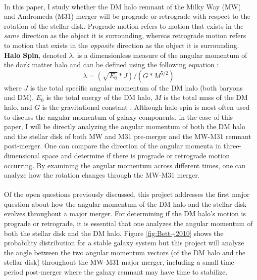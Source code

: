 \documentclass[fleqn,usenatbib]{mnras}
\begin{document}
\paragraph{} In this paper, I study whether the DM halo remnant of the Milky Way (MW) and Andromeda (M31) merger will be prograde or retrograde with respect to the rotation of the stellar disk. Prograde motion refers to motion that exists in the \textit{same} direction as the object it is surrounding, whereas retrograde motion refers to motion that exists in the \textit{opposite} direction as the object it is surrounding. \textbf{Halo Spin}, denoted $\lambda$, is a dimensionless measure of the angular momentum of the dark matter halo and can be defined using the following equation \citep{Peebles}:
\begin{equation}
    \lambda = (\sqrt{E_0} * J) / (G * M^{5/2})
\end{equation}
where $J$ is the total specific angular momentum of the DM halo (both baryons and DM), $E_0$ is the total energy of the DM halo, $M$ is the total mass of the DM halo, and $G$ is the gravitational constant \citep{Obreja+2021}. Although halo spin is most often used to discuss the angular momentum of galaxy components, in the case of this paper, I will be directly analyzing the angular momentum of both the DM halo and the stellar disk of both MW and M31 pre-merger and the MW-M31 remnant post-merger. One can compare the direction of the angular momenta in three-dimensional space and determine if there is prograde or retrograde motion occurring. By examining the angular momentum across different times, one can analyze how the rotation changes through the MW-M31 merger.

\paragraph{} Of the open questions previously discussed, this project addresses the first major question about how the angular momentum of the DM halo and the stellar disk evolves throughout a major merger. For determining if the DM halo's motion is prograde or retrograde, it is essential that one analyzes the angular momentum of both the stellar disk and the DM halo. Figure \ref{fig:Bett+2010} shows the probability distribution for a stable galaxy system but this project will analyze the angle between the two angular momentum vectors (of the DM halo and the stellar disk) throughout the MW-M31 major merger, including a small time period post-merger where the galaxy remnant may have time to stabilize.
\end{document}
